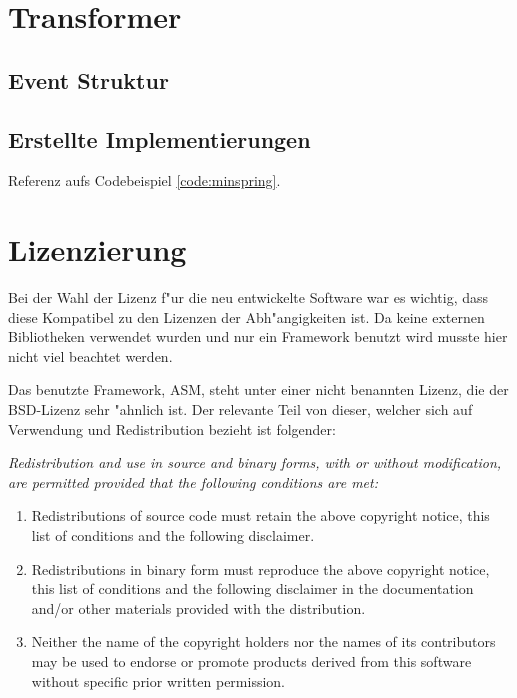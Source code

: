 \section{Transformer} 
\label{sec:trans}



\subsection{Event Struktur} 



\subsection{Erstellte Implementierungen} 


Referenz aufs Codebeispiel \ref{code:minspring}.

 

\section{Lizenzierung} 

Bei der Wahl der Lizenz f"ur die neu entwickelte Software war es wichtig, dass diese Kompatibel zu den Lizenzen der Abh"angigkeiten ist. Da keine externen Bibliotheken verwendet wurden und nur ein Framework benutzt wird musste hier nicht viel beachtet werden.

Das benutzte Framework, ASM, steht unter einer nicht benannten Lizenz, die der BSD-Lizenz sehr "ahnlich ist. Der relevante Teil von dieser, welcher sich auf Verwendung und Redistribution bezieht ist folgender:

{\itshape
Redistribution and use in source and binary forms, with or without
modification, are permitted provided that the following conditions
are met:

\begin{enumerate}
	\item Redistributions of source code must retain the above copyright notice, this list of conditions and the following disclaimer.
	\item Redistributions in binary form must reproduce the above copyright notice, this list of conditions and the following disclaimer in the documentation and/or other materials provided with the distribution.
	\item Neither the name of the copyright holders nor the names of its contributors may be used to endorse or promote products derived from this software without specific prior written permission.
\end{enumerate}
}
\cite{asm_license}


